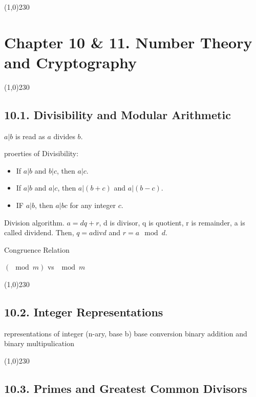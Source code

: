 \begin{center}
\line(1,0){230}
\end{center}

\section*{Chapter 10 \& 11. Number Theory and Cryptography}

\begin{center}
\line(1,0){230}
\end{center}

\subsection*{10.1. Divisibility and Modular Arithmetic}

$a|b$ is read as $a$ divides $b$.

proerties of Divisibility:
\begin{itemize}
    \item If $a|b$ and $b|c$, then $a|c$.
    \item If $a|b$ and $a|c$, then $a|(b+c)$ and $a|(b-c)$.
    \item IF $a|b$, then $a|bc$ for any integer $c$.
\end{itemize}
Division algorithm. $a = dq + r$, d is divisor, q is quotient, r is remainder, a is called dividend. Then, $q = a \text{div} d$ and $r = a \mod d$.

\noindent
Congruence Relation

\noindent
$(\mod m)$ vs $\mod m$

\begin{center}
\line(1,0){230}
\end{center}

\subsection*{10.2. Integer Representations}

representations of integer (n-ary, base b)
base conversion
binary addition and binary multipulication

\begin{center}
\line(1,0){230}
\end{center}

\subsection*{10.3. Primes and Greatest Common Divisors}


